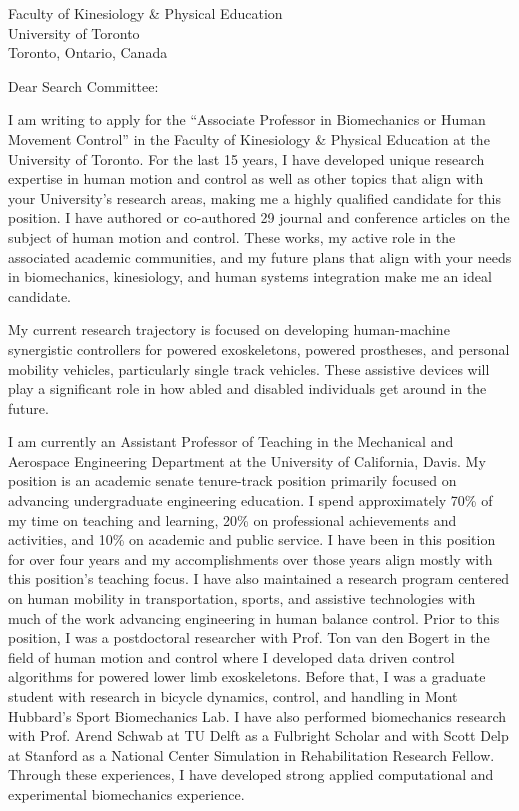 \documentclass{letter}
\date{}
\begin{document}
\begin{letter}{
  Faculty of Kinesiology \& Physical Education \\
  University of Toronto \\
  Toronto, Ontario, Canada
}

\opening{Dear Search Committee:}

I am writing to apply for the ``Associate Professor in Biomechanics or Human
Movement Control'' in the Faculty of Kinesiology \& Physical Education at the
University of Toronto. For the last 15 years, I have developed unique research
expertise in human motion and control as well as other topics that align with
your University's research areas, making me a highly qualified candidate for
this position. I have authored or co-authored 29 journal and conference
articles on the subject of human motion and control. These works, my active
role in the associated academic communities, and my future plans that align
with your needs in biomechanics, kinesiology, and human systems integration
make me an ideal candidate.

My current research trajectory is focused on developing human-machine
synergistic controllers for powered exoskeletons, powered prostheses, and
personal mobility vehicles, particularly single track vehicles. These assistive
devices will play a significant role in how abled and disabled individuals get
around in the future.

I am currently an Assistant Professor of Teaching in the Mechanical and
Aerospace Engineering Department at the University of California, Davis. My
position is an academic senate tenure-track position primarily focused on
advancing undergraduate engineering education. I spend approximately 70\% of my
time on teaching and learning, 20\% on professional achievements and
activities, and 10\% on academic and public service. I have been in this
position for over four years and my accomplishments over those years align
mostly with this position's teaching focus. I have also maintained a research
program centered on human mobility in transportation, sports, and assistive
technologies with much of the work advancing engineering in human balance
control. Prior to this position, I was a postdoctoral researcher with Prof. Ton
van den Bogert in the field of human motion and control where I developed data
driven control algorithms for powered lower limb exoskeletons. Before that, I
was a graduate student with research in bicycle dynamics, control, and handling
in Mont Hubbard's Sport Biomechanics Lab. I have also performed biomechanics
research with Prof. Arend Schwab at TU Delft as a Fulbright Scholar and with
Scott Delp at Stanford as a National Center Simulation in Rehabilitation
Research Fellow. Through these experiences, I have developed strong applied
computational and experimental biomechanics experience.


\end{letter}
\end{document}
